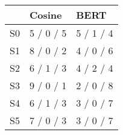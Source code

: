 \begin{tabular}{lll}
\toprule
 & Cosine & BERT \\
\midrule
S0 & 5 / 0 / 5 & 5 / 1 / 4 \\
S1 & 8 / 0 / 2 & 4 / 0 / 6 \\
S2 & 6 / 1 / 3 & 4 / 2 / 4 \\
S3 & 9 / 0 / 1 & 2 / 0 / 8 \\
S4 & 6 / 1 / 3 & 3 / 0 / 7 \\
S5 & 7 / 0 / 3 & 3 / 0 / 7 \\
\bottomrule
\end{tabular}
